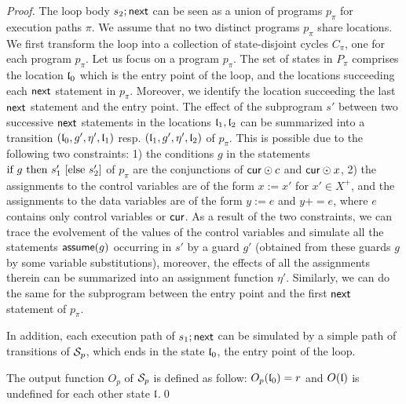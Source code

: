 \begin{appendix}
\begin{proof}
The loop body $s_2;\mathsf{next}$ can be seen as a union of programs $p_\pi$ for execution paths $\pi$. We assume that no two distinct programs $p_\pi$ share locations. We first transform the loop into a collection of state-disjoint cycles $C_\pi$, one for each program $p_\pi$.  Let us focus on a program $p_\pi$. The set of states in $P_\pi$ comprises the location $\mathfrak{l}_0$ which is the entry point of the loop, and the locations succeeding each $\mathsf{next}$ statement in $p_\pi$. Moreover, we identify the location succeeding the last $\mathsf{next}$ statement and the entry point. The effect of the subprogram $s'$ between two successive $\mathsf{next}$ statements in the locations $\mathfrak{l}_1,\mathfrak{l}_2$ can be summarized into a transition $(\mathfrak{l}_0, g', \eta', \mathfrak{l}_1)$ resp. $(\mathfrak{l}_1, g', \eta', \mathfrak{l}_2)$ of $p_\pi$. This is possible due to the following two constraints: 1) the conditions $g$ in the statements $\mbox{if } g \mbox{ then } s'_1 \mbox{ [else }s'_2\mbox{]}$  of $p_\pi$ are the conjunctions of $\mathsf{cur} \odot c$ and $\mathsf{cur} \odot x$, 2) the assignments to the control variables are of the form $x:=x'$ for $x' \in X^+$, and the assignments to the data variables are of the form $y:=e$ and $y {+=} e$, where $e$ contains only control variables or $\mathsf{cur}$. As a result of the two constraints, we can trace the evolvement of the values of the control variables and simulate all the statements $\mathsf{assume}(g)$ occurring in $s'$ by a guard $g'$ (obtained from these guards $g$ by some variable substitutions),  moreover, the effects of all the assignments therein can be summarized into an assignment function $\eta'$.  Similarly, we can do the same for the subprogram between the entry point and the first $\mathsf{next}$ statement of $p_\pi$.

In addition, each execution path of $s_1;\mathsf{next}$ can be simulated by a simple path of transitions of ${\mathcal{S} }_p$, which ends in the state $\mathfrak{l}_0$, the entry point of the loop.

The output function $O_p$ of ${\mathcal{S} }_p$ is defined as follow: $O_p(\mathfrak{l}_0) = r$ and $O(\mathfrak{l})$ is undefined for each other state $\mathfrak{l}$.\qed
\end{proof}


\end{appendix}
